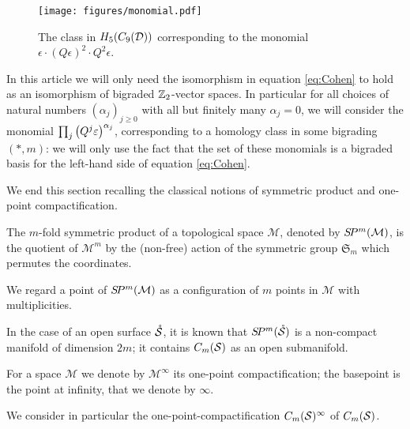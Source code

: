  \begin{figure}\centering
 \texttt{[image: figures/monomial.pdf]}
 \caption{The class in $H_5(C_9(\mathcal{D}))$ corresponding to the monomial $\epsilon\cdot(Q\epsilon)^2\cdot Q^2\epsilon$.}
\label{fig:monomial}
\end{figure}

In this article we will only need the isomorphism in equation \eqref{eq:Cohen} to hold as
an isomorphism of bigraded $\mathbb{Z}_2$-vector spaces.
In particular for all choices of natural numbers $(\alpha_j)_{j\geq 0}$ with all but finitely
many $\alpha_j=0$, we will consider the monomial $\prod_j\left(Q^j\varepsilon\right)^{\alpha_j}$, corresponding to
a homology class in some bigrading $(*,m)$: we will only use the fact
that the set of these monomials is a bigraded basis for the
left-hand side of equation \eqref{eq:Cohen}.

We end this section recalling the classical notions of symmetric product and one-point compactification.

\begin{defn}
 \label{defn:SP}
 The $m$-fold symmetric product of a topological space $\mathcal{M}$, denoted by $S\!P^m(\mathcal{M})$, is
 the quotient of $\mathcal{M}^m$ by the (non-free) action of the symmetric group $\mathfrak{S}_m$
 which permutes the coordinates.
\end{defn}
We regard a point of $S\!P^m(\mathcal{M})$ as a configuration of $m$ points in $\mathcal{M}$ with multiplicities.

In the case of an open surface $\mathring{\mathcal{S}}$, it is known that $S\!P^m(\mathring{\mathcal{S}})$ is a non-compact manifold of dimension $2m$;
it contains $C_m(\mathcal{S})$ as an open submanifold.

\begin{defn}
 \label{defn:opc}
For a space $\mathcal{M}$ we denote by $\mathcal{M}^{\infty}$ its one-point
compactification; the basepoint is the point at infinity, that we denote by $\infty$.
\end{defn}


We consider in particular the one-point-compactification $C_m(\mathcal{S})^{\infty}$ of $C_m(\mathcal{S})$.
